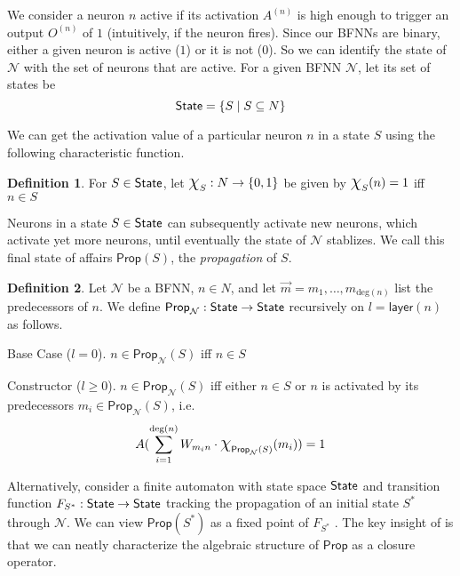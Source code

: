 \documentclass[letterpaper]{article}
\theoremstyle{definition}
\newtheorem{definition}{Definition}
\newcommand{\State}{\mbox{\sf State}}
\newcommand{\set}[1]{\{ #1 \}}
\newcommand*{\bigchi}{\mbox{\Large$\chi$}}%
\newcommand{\degree}[1]{\mathrm{deg}(#1)}
\newcommand{\layer}[1]{\mathsf{layer}(#1)}
\newcommand{\Prop}{\textsf{Prop}}
\newcommand{\Net}{\mathcal{N}}
\begin{document}
We consider a neuron $n$ active if its activation $A^{(n)}$ is high enough to trigger an output $O^{(n)}$ of $1$ (intuitively, if the neuron fires).  Since our BFNNs are binary, either a given neuron is active ($1$) or it is not ($0$).  So we can identify the state of $\Net$ with the set of neurons that are active.  For a given BFNN $\Net$, let its set of states be
\[
    \State = \set{S \mid S \subseteq N}
\]

We can get the activation value of a particular neuron $n$ in a state $S$ using the following characteristic function.
\begin{definition}
    For $S \in \State$, let 
    $\bigchi_S : N \to \set{0, 1}$ be given by $\bigchi_S(n) = 1$ iff $n \in S$
\end{definition}

Neurons in a state $S \in \State$ can subsequently activate new neurons, which activate yet more neurons, until eventually the state of $\Net$ stablizes.  We call this final state of affairs $\Prop(S)$, the \emph{propagation} of $S$.

\begin{definition}
    Let $\Net$ be a BFNN, $n \in N$, and let $\vec{m} = m_1, \ldots, m_{\degree{n}}$ list the predecessors of $n$.  We define $\Prop_\Net : \State \to \State$ recursively on $l = \layer{n}$ as follows.
\begin{compactdesc}
    \item[Base Case ($l = 0$).] $n \in \Prop_\Net(S)$ iff $n \in S$
    \item[Constructor ($l \geq 0$).] $n \in \Prop_\Net(S)$ iff either $n \in S$ or $n$ is activated by its predecessors $m_i \in \Prop_\Net(S)$, i.e.
    \[
    A(\sum_{i=1}^{\degree{n}} W_{m_i n} \cdot \bigchi_{\Prop_\Net(S)}(m_i)) = 1
    \]
\end{compactdesc}
\end{definition}

Alternatively, consider a finite automaton with state space $\State$ and transition function $F_{S^\ast} : \State \to \State$ tracking the propagation of an initial state $S^\ast$ through $\Net$.  We can view $\Prop(S^\ast)$ as a fixed point of $F_{S^\ast}$ \citep{leitgeb2001nonmonotonic}.
The key insight of \citep{leitgeb2001nonmonotonic} is that we can neatly characterize the algebraic structure of $\Prop$ as a closure operator.
\end{document}
